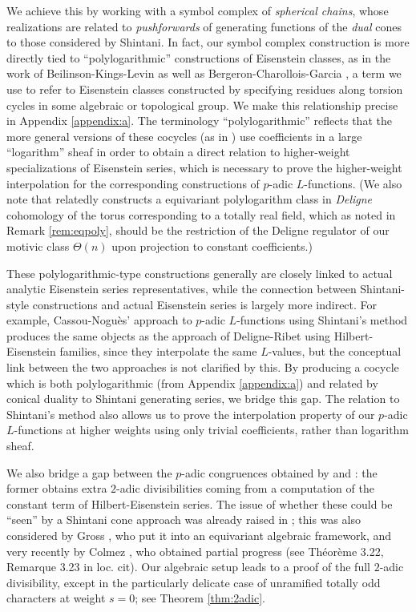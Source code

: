 \documentclass[10pt]{amsart}
\theoremstyle{definition}
\numberwithin{equation}{section}
\begin{document}
    We achieve this by working with a symbol complex of \emph{spherical chains}, whose realizations are related to \emph{pushforwards} of generating functions of the \emph{dual} cones to those considered by Shintani. In fact, our symbol complex construction is more directly tied to ``polylogarithmic'' constructions of Eisenstein classes, as in the work of Beilinson-Kings-Levin \cite{BKL} as well as Bergeron-Charollois-Garcia \cite{BCG} \cite{BCGV}, a term we use to refer to Eisenstein classes constructed by specifying residues along torsion cycles in some algebraic or topological group. We make this relationship precise in Appendix \ref{appendix:a}. The terminology ``polylogarithmic'' reflects that the more general versions of these cocycles (as in \cite{BKL}) use coefficients in a large ``logarithm'' sheaf in order to obtain a direct relation to higher-weight specializations of Eisenstein series, which is necessary to prove the higher-weight interpolation for the corresponding constructions of $p$-adic $L$-functions. (We also note that \cite{BHYY} relatedly constructs a equivariant polylogarithm class in \emph{Deligne} cohomology of the torus corresponding to a totally real field, which as noted in Remark \ref{rem:eqpoly}, should be the restriction of the Deligne regulator of our motivic class $\Theta(n)$ upon projection to constant coefficients.)
    
    These polylogarithmic-type constructions generally are closely linked to actual analytic Eisenstein series representatives, while the connection between Shintani-style constructions and actual Eisenstein series is largely more indirect. For example, Cassou-Noguès' \cite{CN} approach to $p$-adic $L$-functions using Shintani's method produces the same objects as the approach of Deligne-Ribet \cite{DR} using Hilbert-Eisenstein families, since they interpolate the same $L$-values, but the conceptual link between the two approaches is not clarified by this. By producing a cocycle which is both polylogarithmic (from Appendix \ref{appendix:a}) and related by conical duality to Shintani generating series, we bridge this gap. The relation to Shintani's method also allows us to prove the interpolation property of our $p$-adic $L$-functions at higher weights using only trivial coefficients, rather than logarithm sheaf.

    We also bridge a gap between the $p$-adic congruences obtained by \cite{DR} and \cite{CN}: the former obtains extra $2$-adic divisibilities coming from a computation of the constant term of Hilbert-Eisenstein series. The issue of whether these could be ``seen'' by a Shintani cone approach was already raised in \cite{DR}; this was also considered by Gross \cite{Gro}, who put it into an equivariant algebraic framework, and very recently by Colmez \cite{Col}, who obtained partial progress (see Théorème 3.22, Remarque 3.23 in loc. cit). Our algebraic setup leads to a proof of the full $2$-adic divisibility, except in the particularly delicate case of unramified totally odd characters at weight $s=0$; see Theorem \ref{thm:2adic}.
    
\end{document}
